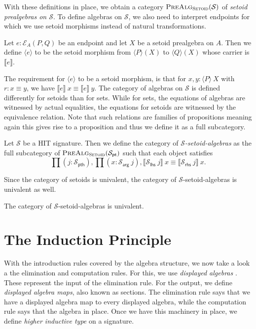 \documentclass[9pt]{entcs}
\newcommand{\category}[1]{\textsc{#1}}
\newcommand{\deprod}[3]{\prod(#1 : #2), #3} %
\newcommand{\0}{\textbf{0}} %
\newcommand{\setoids}{\category{Setoid}} %
\newcommand{\ep}[3]{\mathcal{E}_{#1}(#2,#3)} %
\newcommand{\pt}[0]{\textsf{pt}}
\newcommand{\pthI}[0]{\textsf{pth}}
\newcommand{\pthA}[0]{\textsf{arg}}
\newcommand{\pthlh}[0]{\textsf{lhs}}
\newcommand{\pthrh}[0]{\textsf{rhs}}
\newcommand{\pointc}[1]{#1_{\pt}} %
\newcommand{\pathI}[1]{#1_{\pthI}} %
\newcommand{\pathA}[1]{#1_{\pthA}} %
\newcommand{\pathlh}[1]{#1_{\pthlh}} %
\newcommand{\pathrh}[1]{#1_{\pthrh}} %
\newcommand{\sig}{\mathcal{S}} %
\newcommand{\semP}[1]{\llbracket #1 \rrbracket} %
\newcommand{\semE}[1]{\llbracket #1 \rrbracket} %
\newcommand{\semPT}[1]{\langle #1 \rangle} %
\newcommand{\semET}[1]{\langle #1 \rangle} %
\newcommand{\prealgst}[1]{\category{PreAlg}_{\setoids}(#1)} %
\begin{document}
With these definitions in place, we obtain a category $\prealgst{\sig}$ of \emph{setoid prealgebras on $\sig$}.
To define algebras on $\sig$, we also need to interpret endpoints for which we use setoid morphisms instead of natural transformations.

\begin{definition}
Let $e : \ep{A}{P}{Q}$ be an endpoint and let $X$ be a setoid prealgebra on $A$.
Then we define $\semET{e}$ to be the setoid morphism from $\semPT{P}(X)$ to $\semPT{Q}(X)$ whose carrier is $\semP{e}$.
\end{definition}

The requirement for $\semET{e}$ to be a setoid morphism, is that for $x, y : \semPT{P} \> X$ with $r : x \equiv y$, we have $\semP{e} \> x \equiv \semP{e} \> y$.
The category of algebras on $\sig$ is defined differently for setoids than for sets.
While for sets, the equations of algebras are witnessed by actual equalities, the equations for setoids are witnessed by the equivalence relation.
Note that such relations are families of propositions meaning again this gives rise to a proposition and thus we define it as a full subcategory.

\begin{definition}
Let $\sig$ be a HIT signature.
Then we define the category of \emph{$\sig$-setoid-algebras} as the full subcategory of $\prealgst{\pointc{\sig}}$ such that each object satisfies
\[
\deprod{j}{\pathI{\sig}}{\deprod{x}{\pathA{\sig} \> j}{\semE{\pathlh{\sig} \> j} \> x \equiv \semE{\pathrh{\sig} \> j} \> x}}.
\]
\end{definition}

Since the category of setoids is univalent, the category of $\sig$-setoid-algebras is univalent as well.

\begin{proposition}
The category of $\sig$-setoid-algebras is univalent.
\end{proposition}

\section{The Induction Principle}
\label{sec:induction}
With the introduction rules covered by the algebra structure, we now take a look a the elimination and computation rules.
For this, we use \emph{displayed algebras} \cite{KaposiK18,Sojakova15}.
These represent the input of the elimination rule.
For the output, we define \emph{displayed algebra maps}, also known as sections.
The elimination rule says that we have a displayed algebra map to every displayed algebra, while the computation rule says that the algebra in place.
Once we have this machinery in place, we define \emph{higher inductive type} on a signature.
\end{document}
